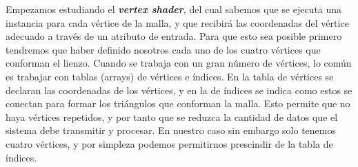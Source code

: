 Empezamos estudiando el \textbf{\textit{vertex shader}}, del cual sabemos que se ejecuta una instancia para cada vértice de la malla, y que recibirá las coordenadas del vértice adecuado a través de un atributo de entrada. Para que esto sea posible primero tendremos que haber definido nosotros cada uno de los cuatro vértices que conforman el lienzo. Cuando se trabaja con un gran número de vértices, lo común es trabajar con tablas (arrays) de vértices e índices. En la tabla de vértices se declaran las coordenadas de los vértices, y en la de índices se indica como estos se conectan para formar los triángulos que conforman la malla. Esto permite que no haya vértices repetidos, y por tanto que se reduzca la cantidad de datos que el sistema debe transmitir y procesar. En nuestro caso sin embargo solo tenemos cuatro vértices, y por simpleza podemos permitirnos prescindir de la tabla de índices.\newline

